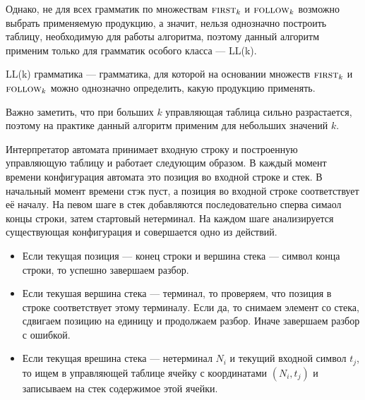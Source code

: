 Однако, не для всех грамматик по множествам $\first[k]$ и $\follow[k]$ возможно выбрать применяемую продукцию, а значит, нельзя однозначно построить таблицу, необходимую для работы алгоритма, поэтому данный алгоритм применим только для грамматик особого класса --- LL(k).

\begin{definition}
  LL(k) грамматика --- грамматика, для которой на основании множеств $\first[k]$ и $\follow[k]$ можно однозначно определить, какую продукцию применять.
\end{definition}

Важно заметить, что при больших $k$ управляющая таблица сильно разрастается, поэтому на практике данный алгоритм применим для небольших значений $k$.

Интерпретатор автомата принимает входную строку и построенную управляющую таблицу и работает следующим образом. 
В каждый момент времени конфигурация автомата это позиция во входной строке и стек. 
В начальный момент времени стэк пуст, а позиция во входной строке соответствует её началу.
На певом шаге в стек добавляются последовательно сперва симаол концы строки, затем стартовый нетерминал.
На каждом шаге анализируется существующая конфигурация и совершается одно из действий.
\begin{itemize}
\item Если текущая позиция --- конец строки и вершина стека --- символ конца строки, то успешно завершаем разбор.
\item Если текушая вершина стека --- терминал, то проверяем, что позиция в строке соответствует этому терминалу. Если да, то снимаем элемент со стека, сдвигаем позицию на единицу и продолжаем разбор. Иначе завершаем разбор с ошибкой.
\item Если текущая врешина стека --- нетерминал $N_i$ и текущий входной символ $t_j$, то ищем в управляющей таблице ячейку с координатами $(N_i, t_j)$ и записываем на стек содержимое этой ячейки.
\end{itemize}

